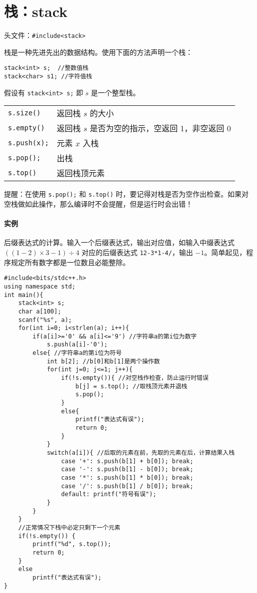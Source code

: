 \documentclass[UTF8]{ctexart}
\newcommand\Emph[1]{\colorbox{green!10}{\textcolor{green!30!black}{#1}}}
\begin{document}
\section{栈：stack}
头文件：\verb!#include<stack>!

栈是一种先进先出的数据结构。使用下面的方法声明一个栈：
\begin{lstlisting}[numbers=none]
stack<int> s;  //整数值栈
stack<char> s1; //字符值栈
\end{lstlisting}

假设有 \verb!stack<int> s;! 即 $s$ 是一个整型栈。
\begin{table}[H]
  \centering
  \begin{tabular}{ll}
    \verb!s.size()! & 返回栈 $s$ 的大小 \\
    \verb!s.empty()! & 返回栈 $s$ 是否为空的指示，空返回 1，非空返回 0 \\
    \verb!s.push(x);! & 元素 $x$ 入栈 \\
    \verb!s.pop();! & 出栈 \\
    \verb!s.top()! & 返回栈顶元素 \\
  \end{tabular}
\end{table}

提醒：在使用 \verb!s.pop();! 和 \verb!s.top()! 时，要记得\Emph{对栈是否为空作出检查}。如果对空栈做如此操作，那么编译时不会提醒，但是运行时会出错！

\paragraph{实例} 后缀表达式的计算。输入一个后缀表达式，输出对应值，如输入中缀表达式 $((1-2)\times 3-1)\div 4$ 对应的后缀表达式 \verb!12-3*1-4/!，输出 $-1$。简单起见，程序规定所有数字都是一位数且必能整除。

\begin{lstlisting}
#include<bits/stdc++.h>
using namespace std;
int main(){
	stack<int> s;
	char a[100];
	scanf("%s", a);
	for(int i=0; i<strlen(a); i++){
		if(a[i]>='0' && a[i]<='9') //字符串a的第i位为数字
			s.push(a[i]-'0');
		else{ //字符串a的第i位为符号
			int b[2]; //b[0]和b[1]是两个操作数
			for(int j=0; j<=1; j++){
				if(!s.empty()){ //对空栈作检查，防止运行时错误
					b[j] = s.top(); //取栈顶元素并退栈
					s.pop();
				}
				else{
					printf("表达式有误");
					return 0;
				}
			}
			switch(a[i]){ //后取的元素在前，先取的元素在后，计算结果入栈
				case '+': s.push(b[1] + b[0]); break;
				case '-': s.push(b[1] - b[0]); break;
				case '*': s.push(b[1] * b[0]); break;
				case '/': s.push(b[1] / b[0]); break;
				default: printf("符号有误");
			}
		}
	}
	//正常情况下栈中必定只剩下一个元素
	if(!s.empty()) {
		printf("%d", s.top());
		return 0;
	}
	else
		printf("表达式有误");
}
\end{lstlisting}
\end{document}
